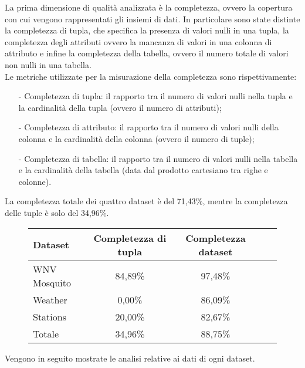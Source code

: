 La prima dimensione di qualità analizzata è la completezza, ovvero la copertura con cui vengono rappresentati gli insiemi di dati.
In particolare sono state distinte la completezza di tupla, che specifica la presenza di valori nulli in una tupla, la completezza degli attributi ovvero la mancanza di valori in una colonna di attributo e infine la completezza della tabella, ovvero il numero totale di valori non nulli in una tabella.\\

Le metriche utilizzate per la misurazione della completezza sono rispettivamente:
\begin{itemize}
		\item[-] Completezza di tupla: il rapporto tra il numero di valori nulli nella tupla e la cardinalità della tupla (ovvero il numero di attributi);
		\item[-] Completezza di attributo: il rapporto tra il numero di valori nulli della colonna e la cardinalità della colonna (ovvero il numero di tuple);
		\item[-] Completezza di tabella: il rapporto tra il numero di valori nulli nella tabella e la cardinalità della tabella (data dal prodotto cartesiano tra righe e colonne).
\end{itemize}


La completezza totale dei quattro dataset è del 71,43\%, mentre la completezza delle tuple è solo del 34,96\%.

\begin{figure}[H]
	\centering
	\begin{tabular}{lcccc}
		\toprule
		\textbf{Dataset} \quad & \textbf{Completezza di tupla} & \textbf{Completezza dataset} \\
		\midrule
		WNV Mosquito &		84,89\%  	& 97,48\%  \\ 
		Weather 	 &		 0,00\% 	& 86,09\%  \\ 
		Stations 	 &		20,00\% 	& 82,67\%  \\ 
		\midrule
		Totale 		 &	    34,96\%     & 88,75\%  \\
		\bottomrule
	\end{tabular}
	\label{tab:completezza totale}
\end{figure}

Vengono in seguito mostrate le analisi relative ai dati di ogni dataset.

